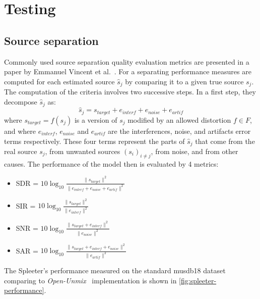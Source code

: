 \chapter{Testing}\label{ch:testing}

\section{Source separation}\label{sec:testing:source-separation}
Commonly used source separation quality evaluation metrics are presented in a paper by Emmanuel Vincent et al.~\cite{vincent2006performance}.
For a separating performance measures are computed for each estimated source $\hat{s}_j$ by comparing it to a given true
source $s_j$. The computation of the criteria involves two successive steps. In a first step, they decompose $\hat{s}_j$
as:
\[\hat{s}_j = s_{target} + e_{interf} + e_{noise} + e_{artif}\]
where $s_{target} = f(s_j)$ is a version of $s_j$ modified by an allowed distortion $f \in F$, and where $e_{interf}$,
$e_{noise}$ and $e_{artif}$ are the interferences, noise, and artifacts error terms respectively. These four terms
represent the parts of $\hat{s}_j$ that come from the real source $s_j$, from unwanted sources $(s_i)_{i \neq j}$, from
noise, and from other causes. The performance of the model then is evaluated by 4 metrics:

\begin{itemize}
	\item \ac{SDR} = $10 \log_{10} \frac{\parallel s_{target} \parallel^2}{\parallel e_{interf} + e_{noise} + e_{artif} \parallel^2}$
	\item \ac{SIR} = $10 \log_{10} \frac{\parallel s_{target} \parallel^2}{\parallel e_{interf} \parallel^2}$
	\item \ac{SNR} = $10 \log_{10} \frac{\parallel s_{target} + e_{interf} \parallel^2}{\parallel e_{noise} \parallel^2}$
	\item \ac{SAR} = $10 \log_{10} \frac{\parallel s_{target} + e_{interf} + e_{noise} \parallel^2}{\parallel e_{artif} \parallel^2}$
\end{itemize}

The Spleeter's performance measured on the standard musdb18 dataset~\cite{musdb18} comparing to \textit{Open-Unmix}~\cite{stoter19}
implementation is shown in \cref{fig:spleeter-performance}.

